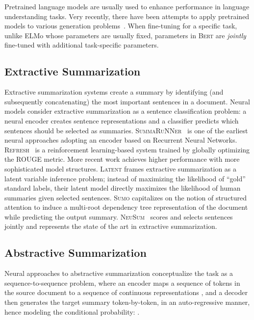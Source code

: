 \documentclass[11pt,a4paper]{article}
\begin{document}
    Pretrained language models are usually used to enhance performance
in language understanding tasks.  Very recently, there have been
attempts to apply pretrained models to various generation
problems~\cite{edunov2019pre,rothe2019leveraging}.  When
fine-tuning for a specific task, unlike ELMo whose parameters are
usually fixed, parameters in \textsc{Bert} are \emph{jointly}
fine-tuned with additional task-specific parameters.

    
    
    \subsection{Extractive Summarization}
    \label{sec:extr-summ-1}
    Extractive summarization systems create a summary by identifying (and
    subsequently concatenating) the most important sentences in a
    document.  
Neural models consider extractive summarization as a sentence
    classification problem: a neural encoder creates sentence
    representations and a classifier predicts which sentences should be
    selected as summaries.
    \textsc{SummaRuNNer}~\cite{nallapati2017summarunner} is one of the
    earliest neural approaches adopting an encoder based on Recurrent
    Neural Networks.  \textsc{Refresh}~\cite{narayan2018ranking} is a
    reinforcement learning-based system trained by globally optimizing the
    ROUGE metric.  More recent work achieves higher performance with more
    sophisticated model structures.  \textsc{Latent}
    \cite{zhang2018neural} frames extractive summarization as a latent
    variable inference problem; instead of maximizing the likelihood of
    ``gold'' standard labels, their latent model directly maximizes the
    likelihood of human summaries given selected sentences.  
    \textsc{Sumo}
    \cite{yang19sumo} capitalizes on the notion of structured attention to
    induce a multi-root dependency tree representation of the document
    while predicting the output summary.
    \textsc{NeuSum}~\cite{zhou2018neural} scores and selects sentences
    jointly and represents the state of the art in extractive
    summarization.
    
    
    \subsection{Abstractive Summarization}
    \label{sec:abstr-summ-1}
    
    Neural approaches to abstractive summarization conceptualize the task
    as a sequence-to-sequence problem,
where an encoder maps a sequence of tokens in the source document
     to a sequence of continuous
    representations , and a decoder then
    generates the target summary 
    token-by-token, in an auto-regressive manner, hence modeling the
    conditional probability: .
    
\end{document}
